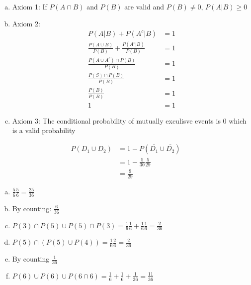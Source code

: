 \documentclass[12pt]{article}
\newenvironment{problem}[2][Problem]{\begin{trivlist}
\item[\hskip \labelsep {\bfseries #1}\hskip \labelsep {\bfseries #2.}]
  \vspace{1 cm}
}{\end{trivlist}}
\begin{document}
\begin{problem}{2.21}
\item%
  \begin{enumerate}[a.]
    \item Axiom 1: If $P(A \cap B)$ and $P(B)$ are valid and $P(B) \neq 0$, $P(A|B) \geq 0$
    \item Axiom 2: \\
      \begin{align*}
        P(A|B) + P(A^c|B) &= 1 \\
        \frac{P(A \cup B)}{P(B)} + \frac{P(A^c|B)}{P(B)} &= 1 \\
        \frac{P(A\cup A^c)\cap P(B)}{P(B)} &= 1 \\
        \frac{P(S)\cap P(B)}{P(B)} &= 1 \\
        \frac{P(B)}{P(B)} &= 1 \\
        1 &= 1
      \end{align*}
    \item Axiom 3: The conditional probability of mutually exculisve events is 0 which is a valid probability
  \end{enumerate}%
\end{problem}

\begin{problem}{2.23}
  \begin{align*}%
    P(D_1 \cup D_2) &= 1 - P(\bar{D_1} \cup \bar{D_2}) \\
    &= 1 - \frac{5}{30}\frac{5}{29} \\
    &= \frac{9}{29}
  \end{align*}%
\end{problem}

\newpage

\begin{problem}{2.25}
\item %
  \begin{enumerate}[a.]
    \item $\frac{5}{6}\frac{5}{6} = \frac{25}{36}$
    \item By counting: $\frac{6}{36}$
    \item $P(3)\cap P(5) \cup P(5)\cap P(3) = \frac{1}{6}\frac{1}{6} + \frac{1}{6}\frac{1}{6} = \frac{2}{36}$
    \item $P(5)\cap(P(5)\cup P(4)) = \frac{1}{6}\frac{2}{6} = \frac{2}{36}$
    \item By counting $\frac{1}{36}$
    \item $P(6) \cup P(6) \cup P(6 \cap 6) = \frac{1}{6} + \frac{1}{6} + \frac{1}{36} = \frac{11}{36}$
  \end{enumerate}%
\end{problem}
\end{document}
